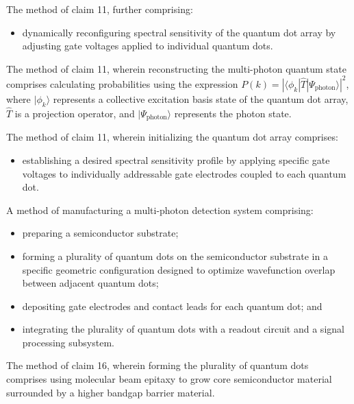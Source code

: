 \documentclass[12pt,letterpaper]{article}
\begin{document}
\begin{patentclaims}
    \item The method of claim 11, further comprising:
    \begin{itemize}[leftmargin=2em]
        \item dynamically reconfiguring spectral sensitivity of the quantum dot array by adjusting gate voltages applied to individual quantum dots.
    \end{itemize}
    
    \item The method of claim 11, wherein reconstructing the multi-photon quantum state comprises calculating probabilities using the expression $P(k) = |\langle\phi_k|\hat{T}|\Psi_{\text{photon}}\rangle|^2$, where $|\phi_k\rangle$ represents a collective excitation basis state of the quantum dot array, $\hat{T}$ is a projection operator, and $|\Psi_{\text{photon}}\rangle$ represents the photon state.
    
    \item The method of claim 11, wherein initializing the quantum dot array comprises:
    \begin{itemize}[leftmargin=2em]
        \item establishing a desired spectral sensitivity profile by applying specific gate voltages to individually addressable gate electrodes coupled to each quantum dot.
    \end{itemize}
    
    \item A method of manufacturing a multi-photon detection system comprising:
    \begin{itemize}[leftmargin=2em]
        \item preparing a semiconductor substrate;
        \item forming a plurality of quantum dots on the semiconductor substrate in a specific geometric configuration designed to optimize wavefunction overlap between adjacent quantum dots;
        \item depositing gate electrodes and contact leads for each quantum dot; and
        \item integrating the plurality of quantum dots with a readout circuit and a signal processing subsystem.
    \end{itemize}
    
    \item The method of claim 16, wherein forming the plurality of quantum dots comprises using molecular beam epitaxy to grow core semiconductor material surrounded by a higher bandgap barrier material.
    

\end{patentclaims}
\end{document}
